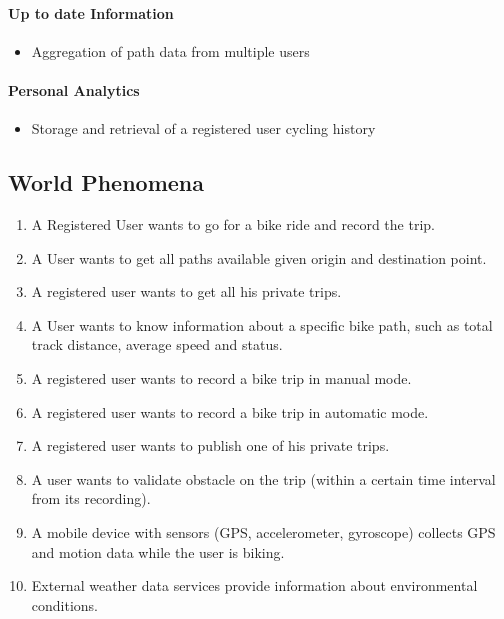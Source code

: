 \paragraph{Up to date Information}
\begin{itemize}
    \item Aggregation of path data from multiple users
\end{itemize}

\paragraph{Personal Analytics}
\begin{itemize}
    \item Storage and retrieval of a registered user cycling history
\end{itemize}



\subsection{World Phenomena}

\begin{enumerate}
    \item A Registered User wants to go for a bike ride and record the trip.
    \item A User wants to get all paths available given origin and destination point.
    \item A registered user wants to get all his private trips.
    \item A User wants to know information about a specific bike path, such as total track distance, average speed and status.
    \item A registered user wants to record a bike trip in manual mode.
    \item A registered user wants to record a bike trip in automatic mode.
    \item A registered user wants to publish one of his private trips.
    \item A user wants to validate obstacle on the trip (within a certain time interval from its recording).
    \item A mobile device with sensors (GPS, accelerometer, gyroscope) collects GPS and motion data while the user is biking.
    \item External weather data services provide information about environmental conditions.
\end{enumerate}


